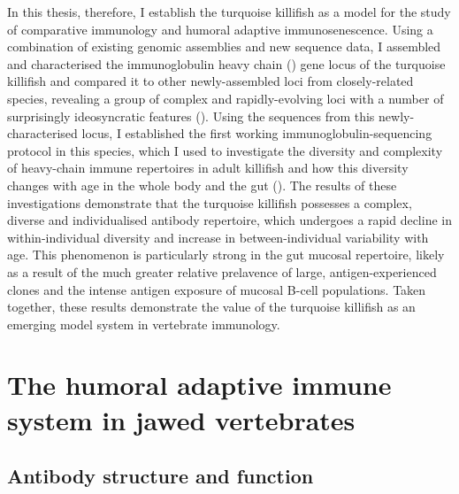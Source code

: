 In this thesis, therefore, I establish the turquoise killifish as a model for the study of comparative immunology and humoral adaptive immunosenescence. Using a combination of existing genomic assemblies and new sequence data, I assembled and characterised the immunoglobulin heavy chain (\igh{}) gene locus of the turquoise killifish and compared it to other newly-assembled loci from closely-related species, revealing a group of complex and rapidly-evolving loci with a number of surprisingly ideosyncratic features (). Using the sequences from this newly-characterised locus, I established the first working immunoglobulin-sequencing protocol in this species, which I used to investigate the diversity and complexity of heavy-chain immune repertoires in adult killifish and how this diversity changes with age in the whole body and the gut (). The results of these investigations demonstrate that the turquoise killifish possesses a complex, diverse and individualised antibody repertoire, which undergoes a rapid decline in within-individual diversity and increase in between-individual variability with age. This phenomenon is particularly strong in the gut mucosal repertoire, likely as a result of the much greater relative prelavence of large, antigen-experienced clones and the intense antigen exposure of mucosal B-cell populations. Taken together, these results demonstrate the value of the turquoise killifish as an emerging model system in vertebrate immunology.

\section{The humoral adaptive immune system in jawed vertebrates}
\label{sec:intro_antibodies}

\subsection{Antibody structure and function}
\label{sec:intro_antibody_structure}

